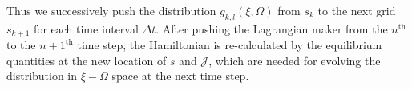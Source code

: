 Thus we successively push the distribution $g_{k,l}(\xi,\Omega)$  from  $s_k$ to the next grid $s_{k+1}$ for each time interval $\Delta t$.
After pushing the Lagrangian maker from the $n^\mathrm{th}$ to the $n+1^\mathrm{th}$ time step, 
the Hamiltonian  is re-calculated by  the  equilibrium quantities  at the new location of $s$ and $\mathcal{J}$, 
which are needed for evolving the distribution in $\xi-\Omega$ space at the next time step.

